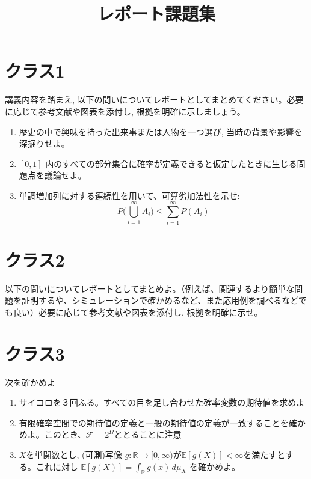 \documentclass[uplatex]{bxjsarticle}
\title{レポート課題集}
\author{}
\date{}
\begin{document}
\maketitle

\section*{クラス1}
講義内容を踏まえ, 以下の問いについてレポートとしてまとめてください。必要に応じて参考文献や図表を添付し, 根拠を明確に示しましょう。
\begin{enumerate}[label=\arabic*.]
\item 歴史の中で興味を持った出来事または人物を一つ選び, 当時の背景や影響を深掘りせよ。
\item $[0, 1]$ 内のすべての部分集合に確率が定義できると仮定したときに生じる問題点を議論せよ。
\item 単調増加列に対する連続性を用いて、可算劣加法性を示せ: $$P\bigl(\bigcup_{i=1}^{\infty} A_i\bigr) \le \sum_{i=1}^{\infty} P(A_i)$$
\end{enumerate}

\section*{クラス2}
以下の問いについてレポートとしてまとめよ。（例えば、関連するより簡単な問題を証明するや、シミュレーションで確かめるなど、また応用例を調べるなどでも良い）必要に応じて参考文献や図表を添付し, 根拠を明確に示せ。

\section*{クラス3}
次を確かめよ
\begin{enumerate}[label=\arabic*.]
\item サイコロを３回ふる。すべての目を足し合わせた確率変数の期待値を求めよ
\item 有限確率空間での期待値の定義と一般の期待値の定義が一致することを確かめよ。このとき、$\mathcal F=2^\Omega$ととることに注意
\item $X$を単関数とし, (可測)写像 $g\colon {}\to[0,\infty)$が$\mathbb{E}[g(X)]<\infty$を満たすとする。これに対し $\displaystyle {}[g(X)]=\int_{} g(x)\,d\mu_X$ を確かめよ。
\end{enumerate}
\end{document}
